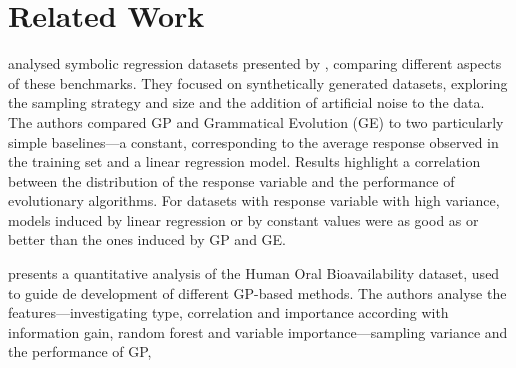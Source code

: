 \section{Related Work}

\citet{nicolau2015guidelines} analysed symbolic regression datasets presented by \citet{mcdermott2012genetic}, comparing different aspects of these benchmarks. They focused on synthetically generated datasets, 
exploring the sampling strategy and size and the addition of artificial noise to the data. The authors compared GP and Grammatical Evolution (GE) to two particularly simple baselines---a constant, corresponding to the average response observed in the training set and a linear regression model. Results highlight a correlation between the distribution of the response variable and the performance of evolutionary algorithms. For datasets with response variable with high variance, models induced by linear regression or by constant values were as good as or better than the ones induced by GP and GE.

\citet{dick2015reexamination} presents a quantitative analysis of the Human Oral Bioavailability dataset, used to guide de development of different GP-based methods. The authors analyse the features---investigating type, correlation and importance according with information gain, random forest and variable importance---sampling variance and the performance of GP, 